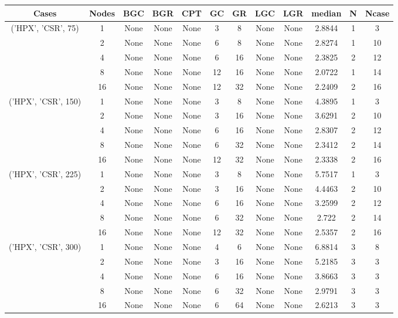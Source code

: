 \begin{tabular}{cccccccccccc}
\hline
Cases & Nodes& BGC& BGR& CPT& GC& GR& LGC& LGR& median & N & Ncase \\
\hline
\multirow{5}{*}{('HPX', 'CSR', 75)}& 1& None& None& None& 3& 8& None& None& 2.8844& 1& 3\\
& 2& None& None& None& 6& 8& None& None& 2.8274& 1& 10\\
& 4& None& None& None& 6& 16& None& None& 2.3825& 2& 12\\
& 8& None& None& None& 12& 16& None& None& 2.0722& 1& 14\\
& 16& None& None& None& 12& 32& None& None& 2.2409& 2& 16\\
\hline
\multirow{5}{*}{('HPX', 'CSR', 150)}& 1& None& None& None& 3& 8& None& None& 4.3895& 1& 3\\
& 2& None& None& None& 3& 16& None& None& 3.6291& 2& 10\\
& 4& None& None& None& 6& 16& None& None& 2.8307& 2& 12\\
& 8& None& None& None& 6& 32& None& None& 2.3412& 2& 14\\
& 16& None& None& None& 12& 32& None& None& 2.3338& 2& 16\\
\hline
\multirow{5}{*}{('HPX', 'CSR', 225)}& 1& None& None& None& 3& 8& None& None& 5.7517& 1& 3\\
& 2& None& None& None& 3& 16& None& None& 4.4463& 2& 10\\
& 4& None& None& None& 6& 16& None& None& 3.2599& 2& 12\\
& 8& None& None& None& 6& 32& None& None& 2.722& 2& 14\\
& 16& None& None& None& 12& 32& None& None& 2.5357& 2& 16\\
\hline
\multirow{5}{*}{('HPX', 'CSR', 300)}& 1& None& None& None& 4& 6& None& None& 6.8814& 3& 8\\
& 2& None& None& None& 3& 16& None& None& 5.2185& 3& 3\\
& 4& None& None& None& 6& 16& None& None& 3.8663& 3& 3\\
& 8& None& None& None& 6& 32& None& None& 2.9791& 3& 3\\
& 16& None& None& None& 6& 64& None& None& 2.6213& 3& 3\\
\hline
\end{tabular}



